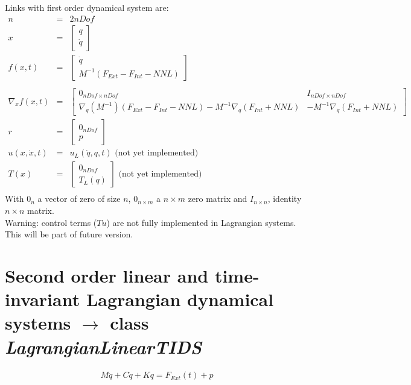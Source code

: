 \documentclass[10pt]{report}
\begin{document}
Links with first order dynamical system are: 
\begin{eqnarray}
  n &= &2nDof \\
  x &=&\left[\begin{array}{c}q \\ \dot q \end{array}\right] \\
  f(x,t) &=&  \left[\begin{array}{c} \dot q \\ M^{-1}(F_{Ext}-F_{Int}-NNL) \end{array}\right] \\
  \\
  \nabla_x f(x,t) &=& 
  \left[\begin{array}{cc} 
      0_{nDof\times nDof} & I_{nDof\times nDof} \\
      \nabla_q(M^{-1})(F_{Ext}-F_{Int}-NNL) -M^{-1}\nabla_q(F_{Int}+NNL) &  -M^{-1}\nabla_{\dot q}(F_{Int}+NNL) 
    \end{array}\right] \\
  r &=& \left[\begin{array}{c} 0_{nDof} \\ p \end{array}\right] \\
  u(x,\dot x,t) &=& u_L(\dot q, q, t) \text{  (not yet implemented)} \\
  T(x) &=& \left[\begin{array}{c} 0_{nDof} \\ T_L(q) \end{array}\right] \text{  (not yet implemented)} \\
\end{eqnarray}
With $0_{n}$ a vector of zero of size $n$, $0_{n\times m}$ a $n\times m$ zero matrix and
$I_{n\times n}$, identity $n\times n$ matrix. \\

Warning: control terms ($Tu$) are not fully implemented in Lagrangian systems. This will be part of future version.

\section{Second order linear and time-invariant Lagrangian dynamical systems $\rightarrow$ class \it{LagrangianLinearTIDS}}

\begin{eqnarray}
M \ddot q + C \dot q + K q =  F_{Ext}(t) + p
\end{eqnarray}
\end{document}
